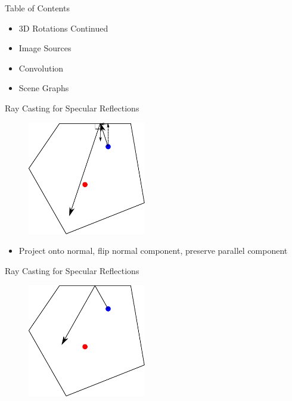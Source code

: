 \documentclass{beamer}
\begin{document}
\begin{frame}{Table of Contents}


\begin{itemize}[label=$\vartriangleright$]
	\item 3D Rotations Continued
\end{itemize}
\begin{itemize}[label=$\blacktriangleright$]
    \item Image Sources
\end{itemize}
\begin{itemize}[label=$\vartriangleright$]
	\item Convolution
	\item Scene Graphs
\end{itemize}

\end{frame}


\begin{frame}{Ray Casting for Specular Reflections}

\begin{figure}[t]
	\centering
    \includegraphics[width=0.46\textwidth]{ImageSources1.pdf}
\end{figure}

\begin{itemize}[label=$\vartriangleright$]
\item Project onto normal, flip normal component, preserve parallel component
\end{itemize}

\end{frame}


\begin{frame}{Ray Casting for Specular Reflections}

\begin{figure}[t]
	\centering
    \includegraphics[width=0.46\textwidth]{ImageSources2.pdf}
\end{figure}

\end{frame}
\end{document}
